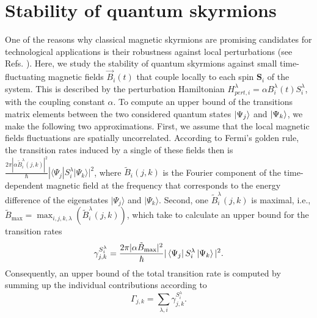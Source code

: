 \documentclass[reprint,aps,prb,superscriptaddress,10pt]{revtex4-2} %
\begin{document}
\section{Stability of quantum skyrmions}\label{SecStability}
One of the reasons why classical magnetic skyrmions are promising
candidates for technological applications is their robustness against local
perturbations (see Refs. \cite{Nagaosa2013, Vedmedenko2019}).
Here, we study the stability of quantum skyrmions against small time-fluctuating magnetic fields $\vec{B}_{i}(t)$ that couple locally to each spin $\textbf{S}_i$ of the system. This is described by the perturbation Hamiltonian
$H_{pert, i}^{\lambda}=\alpha B_i^{\lambda}(t) S_i^{\lambda}$,
with the coupling constant $\alpha$. 
To compute an upper bound of the transitions matrix elements between the two considered quantum states $\ket{\Psi_j}$ and $\ket{\Psi_k}$, we make the following two approximations. 
First, we assume that the local magnetic fields fluctuations are spatially uncorrelated. According to Fermi's golden rule, the transition rates induced by a single of these fields then is $\frac{2\pi |\alpha \tilde{B}_i^\lambda(j,k) |^2}{\hbar}|\langle \Psi_j| S_i^\lambda | \Psi_k\rangle|^2$, where $\tilde{B}_i(j,k)$ is the Fourier component of the time-dependent magnetic field at the frequency that corresponds to the energy difference of the eigenstates $|\Psi_j\rangle$ and $|\Psi_k\rangle$. Second, one $\tilde{B}^\lambda_i(j,k)$ is maximal, i.e., $\tilde{B}_{\text{max}}=\max_{i,j,k,\lambda}{\left(\tilde{B}^\lambda_i(j,k)\right)}$, which take to calculate an upper bound for the transition rates 
\begin{equation}
\gamma_{j,k}^{S_i^{\lambda}} = \frac{2\pi|\alpha
		\tilde{B}_{\text{max}}|^2}{\hbar}|\bra{\Psi_j} S_{i}^{\lambda}\ket{\Psi_k}|^2.
\end{equation}
Consequently, an upper bound of the
total transition rate is computed by summing up the individual
contributions according to
\begin{equation}\label{Transi}
\Gamma_{j,k}=\sum_{\lambda,i}\gamma_{j,k}^{S_i^{\lambda}}.
\end{equation}
\end{document}
